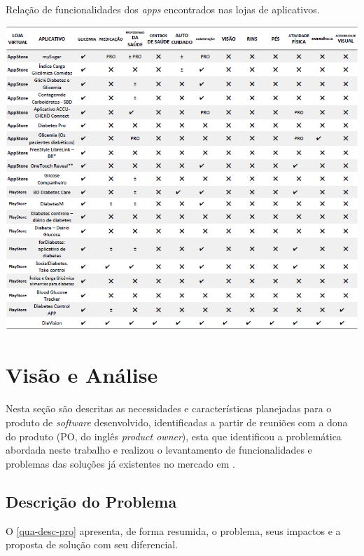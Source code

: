 \begin{table}[htb]
    \caption{\label{tab_cor_func}Relação de funcionalidades dos \emph{apps} encontrados nas lojas de aplicativos.}
    \begin{center}
        \includegraphics[scale=0.82]{Imagens/proposta/busca_anterioridade.png}
    \end{center}
\end{table}

\newpage

\section{Visão e Análise}

Nesta seção são descritas as necessidades e características planejadas para o produto de \emph{software} desenvolvido,
identificadas a partir de reuniões com a dona do produto (PO, do inglês \emph{product owner}), esta que identificou a
problemática abordada neste trabalho e
realizou o levantamento de funcionalidades e problemas das soluções já existentes no mercado em .

\subsection{Descrição do Problema}

O \autoref{qua-desc-pro} apresenta, de forma resumida, o problema, seus impactos e a proposta de solução com seu diferencial.

